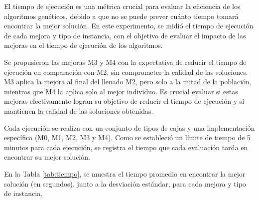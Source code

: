 \documentclass[openany]{article}
\begin{document}
El tiempo de ejecución es una métrica crucial para evaluar la eficiencia de los algoritmos genéticos, debido a que no se puede prever cuánto tiempo tomará encontrar la mejor solución. En este experimento, se midió el tiempo de ejecución de cada mejora y tipo de instancia, con el objetivo de evaluar el impacto de las mejoras en el tiempo de ejecución de los algoritmos.

Se propusieron las mejoras M3 y M4 con la expectativa de reducir el tiempo de ejecución en comparación con M2, sin comprometer la calidad de las soluciones. M3 aplica la mejora al final del llenado M2, pero solo a la mitad de la población, mientras que M4 la aplica solo al mejor individuo. Es crucial evaluar si estas mejoras efectivamente logran su objetivo de reducir el tiempo de ejecución y si mantienen la calidad de las soluciones obtenidas.

Cada ejecución se realiza con un conjunto de tipos de cajas y una implementación específica (M0, M1, M2, M3 y M4). Como se estableció un límite de tiempo de 5 minutos para cada ejecución, se registra el tiempo que cada evaluación tarda en encontrar su mejor solución.

En la Tabla \ref{tab:tiempo}, se muestra el tiempo promedio en encontrar la mejor solución (en segundos), junto a la desviación estándar, para cada mejora y tipo de instancia.
\end{document}
